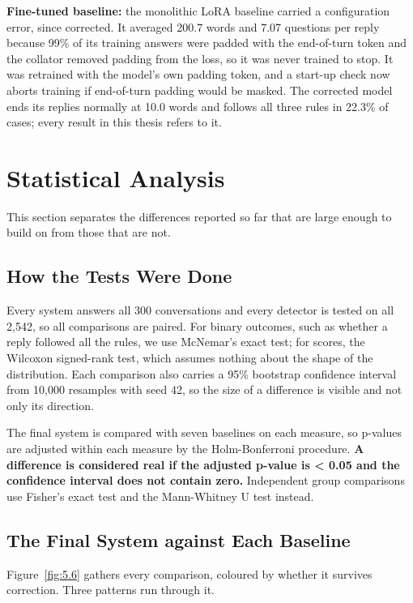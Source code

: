 \textbf{Fine-tuned baseline:} the monolithic LoRA baseline carried a configuration error, since corrected. It averaged 200.7 words and 7.07 questions per reply because 99\% of its training answers were padded with the end-of-turn token and the collator removed padding from the loss, so it was never trained to stop. It was retrained with the model's own padding token, and a start-up check now aborts training if end-of-turn padding would be masked. The corrected model ends its replies normally at 10.0 words and follows all three rules in 22.3\% of cases; every result in this thesis refers to it.

\section{Statistical Analysis}
\label{sec:5.4}

This section separates the differences reported so far that are large enough to build on from those that are not.

\subsection{How the Tests Were Done}
\label{sec:5.4.1}

Every system answers all 300 conversations and every detector is tested on all 2,542, so all comparisons are paired. For binary outcomes, such as whether a reply followed all the rules, we use McNemar's exact test; for scores, the Wilcoxon signed-rank test, which assumes nothing about the shape of the distribution. Each comparison also carries a 95\% bootstrap confidence interval from 10,000 resamples with seed 42, so the size of a difference is visible and not only its direction.

The final system is compared with seven baselines on each measure, so p-values are adjusted within each measure by the Holm-Bonferroni procedure. \textbf{A difference is considered real if the adjusted p-value is < 0.05 and the confidence interval does not contain zero.} Independent group comparisons use Fisher's exact test and the Mann-Whitney U test instead.

\subsection{The Final System against Each Baseline}
\label{sec:5.4.2}

Figure~\ref{fig:5.6} gathers every comparison, coloured by whether it survives correction. Three patterns run through it.

